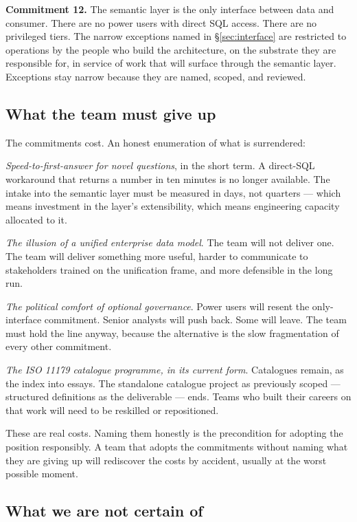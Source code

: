 \documentclass[11pt,a4paper]{article}
\begin{document}
\textbf{Commitment 12.} The semantic layer is the only interface between data and consumer. There are no power users with direct SQL access. There are no privileged tiers. The narrow exceptions named in \S\ref{sec:interface} are restricted to operations by the people who build the architecture, on the substrate they are responsible for, in service of work that will surface through the semantic layer. Exceptions stay narrow because they are named, scoped, and reviewed.

\subsection{What the team must give up}

The commitments cost. An honest enumeration of what is surrendered:

\emph{Speed-to-first-answer for novel questions}, in the short term. A direct-SQL workaround that returns a number in ten minutes is no longer available. The intake into the semantic layer must be measured in days, not quarters --- which means investment in the layer's extensibility, which means engineering capacity allocated to it.

\emph{The illusion of a unified enterprise data model}. The team will not deliver one. The team will deliver something more useful, harder to communicate to stakeholders trained on the unification frame, and more defensible in the long run.

\emph{The political comfort of optional governance}. Power users will resent the only-interface commitment. Senior analysts will push back. Some will leave. The team must hold the line anyway, because the alternative is the slow fragmentation of every other commitment.

\emph{The ISO 11179 catalogue programme, in its current form}. Catalogues remain, as the index into essays. The standalone catalogue project as previously scoped --- structured definitions as the deliverable --- ends. Teams who built their careers on that work will need to be reskilled or repositioned.

These are real costs. Naming them honestly is the precondition for adopting the position responsibly. A team that adopts the commitments without naming what they are giving up will rediscover the costs by accident, usually at the worst possible moment.

\subsection{What we are not certain of}
\end{document}

